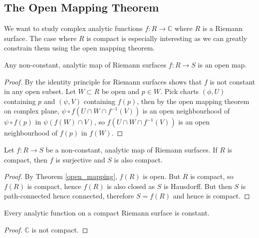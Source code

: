 \subsection{The Open Mapping Theorem}
We want to study complex analytic functions $f:R\to\mathbb C$ where $R$ is a Riemann surface.
The case where $R$ is compact is especially interesting as we can greatly constrain them using the open mapping theorem.
\begin{theorem}\label{open_mapping}
    Any non-constant, analytic map of Riemann surfaces $f:R\to S$ is an open map.
\end{theorem}
\begin{proof}
    By the identity principle for Riemann surfaces shows that $f$ is not constant in any open subset.
    Let $W\subset R$ be open and $p\in W$.
    Pick charts $(\phi,U)$ containing $p$ and $(\psi,V)$ containing $f(p)$, then by the open mapping theorem on complex plane, $\psi\circ f(U\cap W\cap f^{-1}(V))$ is an open neighbourhood of $\psi\circ f(p)$ in $\psi(f(W)\cap V)$, so $f(U\cap W\cap f^{-1}(V))$ is an open neighbourhood of $f(p)$ in $f(W)$.
\end{proof}
\begin{corollary}
    Let $f:R\to S$ be a non-constant, analytic map of Riemann surfaces.
    If $R$ is compact, then $f$ is surjective and $S$ is also compact.
\end{corollary}
\begin{proof}
    By Theorem \ref{open_mapping}, $f(R)$ is open.
    But $R$ is compact, so $f(R)$ is compact, hence $f(R)$ is also closed as $S$ is Hausdorff.
    But then $S$ is path-connected hence connected, therefore $S=f(R)$ and hence is compact.
\end{proof}
\begin{corollary}
    Every analytic function on a compact Riemann surface is constant.
\end{corollary}
\begin{proof}
    $\mathbb C$ is not compact.
\end{proof}